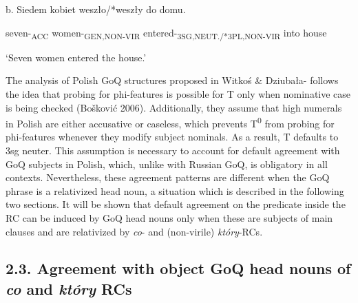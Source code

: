 \documentclass[output=paper]{langsci/langscibook}
\begin{document}
  b.   Siedem   kobiet   weszło/*weszły      do domu.    

    seven-\textsubscript{ACC}   women-\textsubscript{GEN,NON-VIR}   entered-\textsubscript{3SG,NEUT./*3PL,NON-VIR} into house

\begin{styleListParagraph}
    ‘Seven women entered the house.’
\end{styleListParagraph}

\begin{styleListParagraph}
The analysis of Polish GoQ structures proposed in Witkoś \& Dziubała-\citet{Szrejbrowska2016} follows the idea that probing for phi-features is possible for T only when nominative case is being checked (Bošković 2006). Additionally, they assume that high numerals in Polish are either accusative or caseless, which prevents T\textsuperscript{0} from probing for phi-features whenever they modify subject nominals. As a result, T defaults to 3sg neuter. This assumption is necessary to account for default agreement with GoQ subjects in Polish, which, unlike with Russian GoQ, is obligatory in all contexts. Nevertheless, these agreement patterns are different when the GoQ phrase is a relativized head noun, a situation which is described in the following two sections. It will be shown that default agreement on the predicate inside the RC can be induced by GoQ head nouns only when these are subjects of main clauses and are relativized by \textit{co}{}- and (non-virile) \textit{który}{}-RCs.
\end{styleListParagraph}

\subsection{ 2.3. Agreement with object GoQ head nouns of \textit{co} and \textit{który} RCs}
\end{document}
